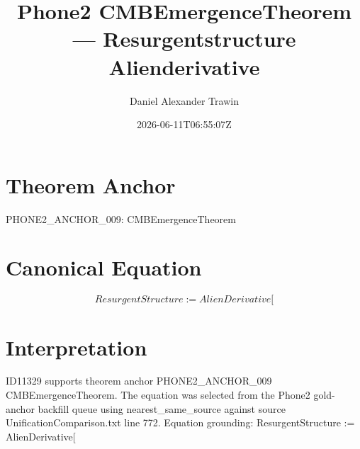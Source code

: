\documentclass[11pt]{article}
\title{Phone2 CMBEmergenceTheorem — Resurgentstructure Alienderivative}
\author{Daniel Alexander Trawin}
\date{2026-06-11T06:55:07Z}
\begin{document}
\maketitle
\section*{Theorem Anchor}
PHONE2_ANCHOR_009: CMBEmergenceTheorem
\section*{Canonical Equation}
\[
ResurgentStructure := AlienDerivative[
\]
\section*{Interpretation}
ID11329 supports theorem anchor PHONE2_ANCHOR_009 CMBEmergenceTheorem. The equation was selected from the Phone2 gold-anchor backfill queue using nearest_same_source against source UnificationComparison.txt line 772. Equation grounding: ResurgentStructure := AlienDerivative[
\end{document}
